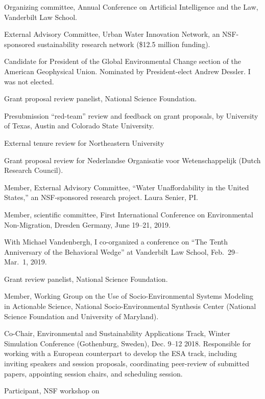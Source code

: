 \item[2016--2022] Organizing committee,
  Annual Conference on Artificial Intelligence and the Law,
  Vanderbilt Law School.
\item[2016--2021] External Advisory Committee,
  Urban Water Innovation Network, an NSF-sponsored sustainability
  research network (\$12.5 million funding).
\item[2022] Candidate for President of the Global Environmental Change
  section of the American Geophysical Union. Nominated by President-elect
  Andrew Dessler. I was not elected.
\item[2022] Grant proposal review panelist, National Science Foundation.
\item[2022] Presubmission ``red-team'' review and feedback on grant proposals,
  by University of Texas, Austin and Colorado State University.
\item[2021] External tenure review for Northeastern University
\item[2021] Grant proposal review for Nederlandse Organisatie voor Wetenschappelijk
  (Dutch Research Council).
\item[2019--2021] Member, External Advisory Committee,
  ``Water Unaffordability in the United States,''
  an NSF-sponsored research project. Laura Senier, PI.
\item[2019] Member, scientific committee,
  First International Conference on Environmental Non-Migration,
  Dresden Germany, June 19--21, 2019.
\item[2019] With Michael Vandenbergh, I co-organized a conference on
  ``The Tenth Anniversary of the Behavioral Wedge'' at Vanderbilt Law School,
   Feb.~29--Mar.~1, 2019.
\item[2018] Grant review panelist, National Science Foundation.
\item[2018] Member, Working Group on the Use of Socio-Environmental Systems
  Modeling in Actionable Science,
  National Socio-Environmental Synthesis Center
  (National Science Foundation and University of Maryland).
\item[2018] Co-Chair, Environmental and Sustainability Applications Track,
   Winter Simulation Conference (Gothenburg, Sweden), Dec. 9--12 2018.
   Responsible for working with a European counterpart to develop the ESA
   track, including inviting speakers and session proposals, coordinating
   peer-review of submitted papers, appointing session chairs, and scheduling
   session.
\item[2017--2018] Participant, NSF workshop on
